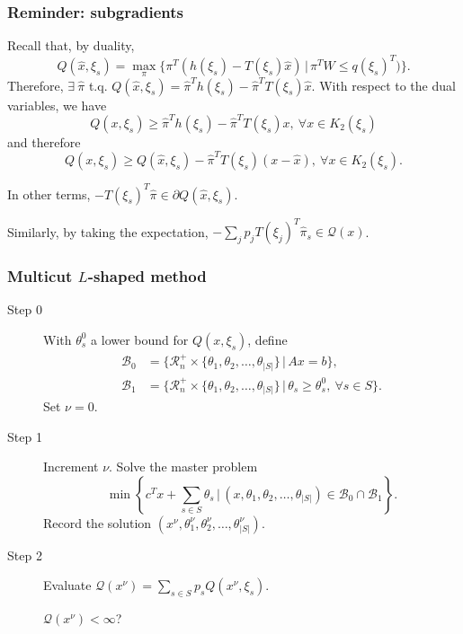 \documentclass{beamer}
\def\rit{\mathcal{R}}
\begin{document}
\begin{frame}
\frametitle{Reminder: subgradients}

Recall that, by {\blue duality},
\[
Q(\hat{x}, \xi_s) =
\max_{\pi} \lbrace \pi^T(h(\xi_s)-T(\xi_s)\hat{x}) \,|\, \pi^TW \leq q(\xi_s)^T) \rbrace.
\]
Therefore, $\exists\ \hat{\pi}$ t.q.
$Q(\hat{x}, \xi_s) = \hat{\pi}^Th(\xi_s)-\hat{\pi}^TT(\xi_s)\hat{x}$.
With respect to the dual variables, we have
\[
Q(x, \xi_s) \geq \hat{\pi}^Th(\xi_s)-\hat{\pi}^TT(\xi_s) x,
\ \forall x \in K_2(\xi_s)
\]
and therefore
\[
Q(x, \xi_s) \geq Q({\hat{x}, \xi_s}) - \hat{\pi}^TT(\xi_s) (x-\hat{x}),
\ \forall x \in K_2(\xi_s).
\]

In other terms, $-T(\xi_s)^T\hat{\pi} \in \partial Q(\hat{x}, \xi_s)$.

\mbox{}

Similarly, by taking the expectation, $- \sum_j p_j T(\xi_j)^T\hat{\pi}_s \in \mathcal{Q}(x)$.

\end{frame}

\begin{frame}
\frametitle{Multicut $L$-shaped method}
	
\begin{description}
\item[Step 0]
With $\theta_s^0$ a lower bound for $Q(x, \xi_s)$, define
\begin{align*}
\mathcal{B}_0 &= \lbrace \rit_n^+ \times \lbrace \theta_1,
\theta_2,\ldots, \theta_{|S|}\rbrace \,|\, Ax = b \rbrace, \\
\mathcal{B}_1 &= \lbrace \rit_n^+ \times \lbrace \theta_1,
\theta_2,\ldots, \theta_{|S|}\rbrace \,|\, \theta_s \geq \theta_s^0,\
\forall s \in S \rbrace.
\end{align*}
Set $\nu = 0$.
\item[Step 1]
Increment $\nu$.
Solve the master problem
\[
\min \left\lbrace c^Tx+\sum_{s \in S} \theta_s \,|\,
(x,\theta_1,\theta_2,\ldots,\theta_{|S|}) \in \mathcal{B}_0 \cap \mathcal{B}_1 \right\rbrace.
\]
Record the solution $( x^{\nu}, \theta_1^{\nu}, \theta_2^{\nu},\ldots,
\theta_{|S|}^{\nu} )$.
\item[Step 2]
Evaluate $\mathcal{Q}(x^{\nu}) = \sum_{s \in S} p_s Q(x^{\nu}, \xi_s)$.
		
		$\mathcal{Q}(x^{\nu}) < \infty$?
\end{description}
	
\end{frame}
\end{document}
